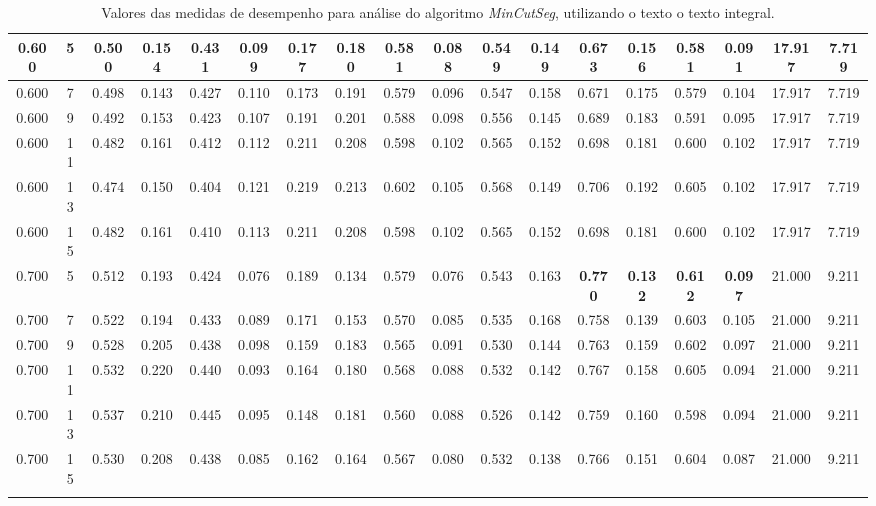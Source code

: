 \begin{longtable}[c]{|c|c|c|c|c|c|c|c|c|c|c|c|c|c|c|c|c|c|}
  0.600 & 5 & 0.500 & 0.154 & 0.431 & 0.099 & 0.177 & 0.180 & 0.581 & 0.088 & 0.549 & 0.149 & 0.673 & 0.156 & 0.581 & 0.091 & 17.917 & 7.719  \\ \hline 
  0.600 & 7 & 0.498 & 0.143 & 0.427 & 0.110 & 0.173 & 0.191 & 0.579 & 0.096 & 0.547 & 0.158 & 0.671 & 0.175 & 0.579 & 0.104 & 17.917 & 7.719  \\ \hline 
  0.600 & 9 & 0.492 & 0.153 & 0.423 & 0.107 & 0.191 & 0.201 & 0.588 & 0.098 & 0.556 & 0.145 & 0.689 & 0.183 & 0.591 & 0.095 & 17.917 & 7.719  \\ \hline 
  0.600 & 11 & 0.482 & 0.161 & 0.412 & 0.112 & 0.211 & 0.208 & 0.598 & 0.102 & 0.565 & 0.152 & 0.698 & 0.181 & 0.600 & 0.102 & 17.917 & 7.719  \\ \hline 
  0.600 & 13 & 0.474 & 0.150 & 0.404 & 0.121 & 0.219 & 0.213 & 0.602 & 0.105 & 0.568 & 0.149 & 0.706 & 0.192 & 0.605 & 0.102 & 17.917 & 7.719  \\ \hline 
  0.600 & 15 & 0.482 & 0.161 & 0.410 & 0.113 & 0.211 & 0.208 & 0.598 & 0.102 & 0.565 & 0.152 & 0.698 & 0.181 & 0.600 & 0.102 & 17.917 & 7.719  \\ \hline 
  0.700 & 5 & 0.512 & 0.193 & 0.424 & 0.076 & 0.189 & 0.134 & 0.579 & 0.076 & 0.543 & 0.163 & \cellcolor{gray!20} \textbf{0.770} & \cellcolor{gray!20} \textbf{0.132} & \cellcolor{gray!20} \textbf{0.612} & \cellcolor{gray!20} \textbf{0.097} & 21.000 & 9.211  \\ \hline 
  0.700 & 7 & 0.522 & 0.194 & 0.433 & 0.089 & 0.171 & 0.153 & 0.570 & 0.085 & 0.535 & 0.168 & 0.758 & 0.139 & 0.603 & 0.105 & 21.000 & 9.211  \\ \hline 
  0.700 & 9 & 0.528 & 0.205 & 0.438 & 0.098 & 0.159 & 0.183 & 0.565 & 0.091 & 0.530 & 0.144 & 0.763 & 0.159 & 0.602 & 0.097 & 21.000 & 9.211  \\ \hline 
  0.700 & 11 & 0.532 & 0.220 & 0.440 & 0.093 & 0.164 & 0.180 & 0.568 & 0.088 & 0.532 & 0.142 & 0.767 & 0.158 & 0.605 & 0.094 & 21.000 & 9.211  \\ \hline 
  0.700 & 13 & 0.537 & 0.210 & 0.445 & 0.095 & 0.148 & 0.181 & 0.560 & 0.088 & 0.526 & 0.142 & 0.759 & 0.160 & 0.598 & 0.094 & 21.000 & 9.211  \\ \hline 
  0.700 & 15 & 0.530 & 0.208 & 0.438 & 0.085 & 0.162 & 0.164 & 0.567 & 0.080 & 0.532 & 0.138 & 0.766 & 0.151 & 0.604 & 0.087 & 21.000 & 9.211  \\ \hline 
 \caption{Valores das medidas de desempenho para análise do algoritmo \textit{MinCutSeg}, utilizando o texto o texto integral.}
 \end{longtable} 

